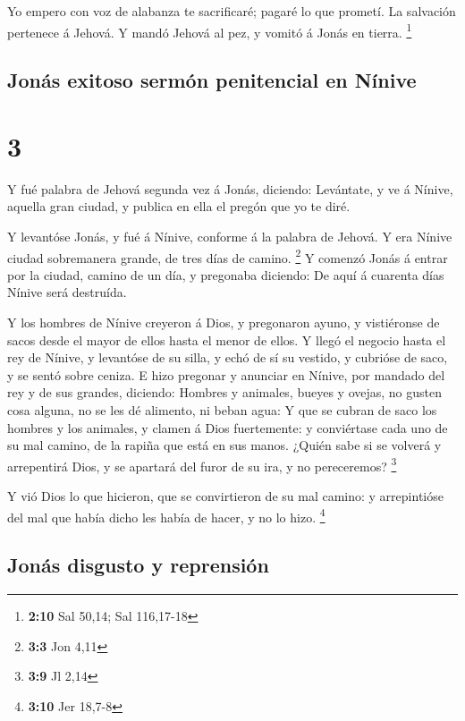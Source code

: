 Yo empero con voz de alabanza te sacrificaré; pagaré lo
que prometí. La salvación pertenece á Jehová. Y mandó Jehová al pez, y
vomitó á Jonás en tierra. \footnote{\textbf{2:10} Sal 50,14; Sal
  116,17-18}

\hypertarget{jonuxe1s-exitoso-sermuxf3n-penitencial-en-nuxednive}{%
\subsection{Jonás exitoso sermón penitencial en
Nínive}\label{jonuxe1s-exitoso-sermuxf3n-penitencial-en-nuxednive}}

\hypertarget{section-2}{%
\section{3}\label{section-2}}

 Y fué palabra de Jehová segunda vez á Jonás, diciendo:
 Levántate, y ve á Nínive, aquella gran ciudad, y publica en
ella el pregón que yo te diré.

 Y levantóse Jonás, y fué á Nínive, conforme á la palabra de
Jehová. Y era Nínive ciudad sobremanera grande, de tres días de camino.
\footnote{\textbf{3:3} Jon 4,11}  Y comenzó Jonás á entrar
por la ciudad, camino de un día, y pregonaba diciendo: De aquí á
cuarenta días Nínive será destruída.

 Y los hombres de Nínive creyeron á Dios, y pregonaron
ayuno, y vistiéronse de sacos desde el mayor de ellos hasta el menor de
ellos.  Y llegó el negocio hasta el rey de Nínive, y
levantóse de su silla, y echó de sí su vestido, y cubrióse de saco, y se
sentó sobre ceniza.  E hizo pregonar y anunciar en Nínive,
por mandado del rey y de sus grandes, diciendo: Hombres y animales,
bueyes y ovejas, no gusten cosa alguna, no se les dé alimento, ni beban
agua:  Y que se cubran de saco los hombres y los animales, y
clamen á Dios fuertemente: y conviértase cada uno de su mal camino, de
la rapiña que está en sus manos.  ¿Quién sabe si se volverá
y arrepentirá Dios, y se apartará del furor de su ira, y no pereceremos?
\footnote{\textbf{3:9} Jl 2,14}

 Y vió Dios lo que hicieron, que se convirtieron de su mal
camino: y arrepintióse del mal que había dicho les había de hacer, y no
lo hizo. \footnote{\textbf{3:10} Jer 18,7-8}

\hypertarget{jonuxe1s-disgusto-y-reprensiuxf3n}{%
\subsection{Jonás disgusto y
reprensión}\label{jonuxe1s-disgusto-y-reprensiuxf3n}}

